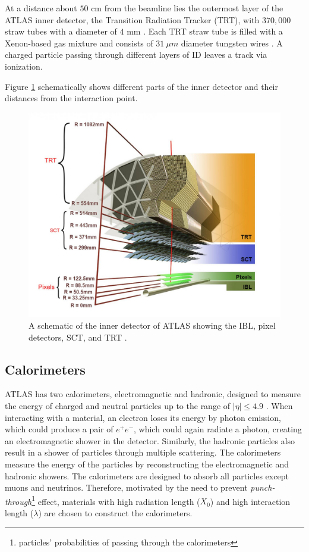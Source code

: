 At a distance about $50$ cm from the beamline lies the outermost layer of the ATLAS inner detector, the Transition Radiation Tracker (TRT), with $370,000$ straw tubes with a diameter of $4$ mm \cite{ID_TRT}. Each TRT straw tube is filled with a Xenon-based gas mixture and consists of $31~\mu m$ diameter tungsten wires \cite{ID_TRT}. A charged particle passing through different layers of ID leaves a track via ionization. 

Figure \ref{fig:ATLAS_ID} schematically shows different parts of the inner detector and their distances from the interaction point.

\begin{figure}
    \centering
    \includegraphics[width=.98\linewidth]{figures/LHC/ATLAS_InnerDetector.jpg}
    \caption{ A schematic of the inner detector of ATLAS showing the IBL, pixel detectors, SCT, and TRT \cite{ID_Align_Run2}.\label{fig:ATLAS_ID}}
\end{figure}

\subsection{Calorimeters}
\label{subsec:Cal}

ATLAS has two calorimeters, electromagnetic and hadronic, designed to measure the energy of charged and neutral particles up to the range of $|\eta|\leq4.9$ \cite{ATLAS}. When interacting with a material, an electron loses its energy by photon emission, which could produce a pair of $e^{+}e^{-}$, which could again radiate a photon, creating an electromagnetic shower in the detector. Similarly, the hadronic particles also result in a shower of particles through multiple scattering. The calorimeters measure the energy of the particles by reconstructing the electromagnetic and hadronic showers. The calorimeters are designed to absorb all particles except muons and neutrinos. Therefore, motivated by the need to prevent \textit{punch-through}\footnote{particles' probabilities of passing through the calorimeters} effect, materials with high radiation length ($X_{0}$) and high interaction length ($\lambda$) are chosen to construct the calorimeters.


